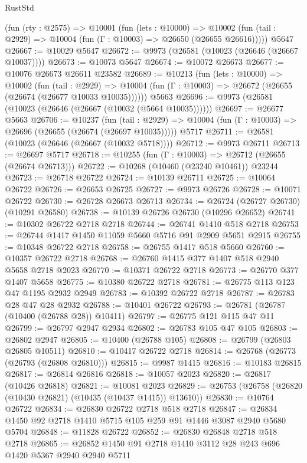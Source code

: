 \begin{lexlean}{RustStd}
\begin{coremodule}
    (fun (rty : @2575) =>
    @10001
      (fun (lets : @10000) =>
      @10002 (fun (tail : @2929) => @10004 (fun (Γ : @10003) => @26650 (@26655 @26616)))))
    @5647
@26667 := @10029 @5647
@26672 := @9973 (@26581 (@10023 (@26646 (@26667 @10037))))
@26673 := @10073 @5647
@26674 := @10072 @26673
@26677 := @10076 @26673 @26611 @23582
@26689 := @10213
    (fun (lets : @10000) =>
    @10002
      (fun (tail : @2929) =>
      @10004 (fun (Γ : @10003) => @26672 (@26655 (@26674 (@26677 @10033 @10035))))))
    @5663
@26696 := @9973 (@26581 (@10023 (@26646 (@26667 (@10032 (@5664 @10035))))))
@26697 := @26677 @5663
@26706 := @10237
    (fun (tail : @2929) => @10004 (fun (Γ : @10003) => @26696 (@26655 (@26674 (@26697 @10035)))))
    @5717
@26711 := @26581 (@10023 (@26646 (@26667 (@10032 @5718))))
@26712 := @9973 @26711
@26713 := @26697 @5717
@26718 := @10255 (fun (Γ : @10003) => @26712 (@26655 (@26674 @26713)))
@26722 := @10268 (@10460 (@23240 @10461)) @23244
@26723 := @26718 @26722
@26724 := @10139 @26711
@26725 := @10064 @26722
@26726 := @26653 @26725
@26727 := @9973 @26726
@26728 := @10071 @26722
@26730 := @26728 @26673 @26713
@26734 := @26724 (@26727 @26730) (@10291 @26580)
@26738 := @10139 @26726 @26730 (@10296 @26652)
@26741 := @10302 @26722 @2718 @2718
@26744 := @26741 @1410 @518 @2718
@26753 := @26744 @1417 @1450 @11059 @5660 @5716 @91 @2909 @5651 @2915
@26755 := @10348 @26722 @2718
@26758 := @26755 @1417 @518 @5660
@26760 := @10357 @26722 @2718
@26768 := @26760 @1415 @377 @1407 @518 @2940 @5658 @2718 @2023
@26770 := @10371 @26722 @2718
@26773 := @26770 @377 @1407 @5658
@26775 := @10380 @26722 @2718
@26781 := @26775 @113 @123 @47 @1195 @2932 @2949
@26783 := @10392 @26722 @2718
@26787 := @26783 @28 @47 @28 @2932
@26788 := @10401 @26722
@26793 := @26781 (@26787 (@10400 (@26788 @28)) @10411)
@26797 := @26775 @121 @115 @47 @11
@26799 := @26797 @2947 @2934
@26802 := @26783 @105 @47 @105
@26803 := @26802 @2947
@26805 := @10400 (@26788 @105)
@26808 := @26799 (@26803 @26805 @10511)
@26810 := @10417 @26722 @2718
@26814 := @26768 (@26773 (@26793 (@26808 @26810)))
@26815 := @9987 @1415
@26816 := @10183 @26815
@26817 := @26814 @26816
@26818 := @10057 @2023
@26820 := @26817 (@10426 @26818)
@26821 := @10081 @2023
@26829 := @26753 (@26758 (@26820 (@10430 @26821) (@10435 (@10437 @1415)) @13610))
@26830 := @10764 @26722
@26834 := @26830 @26722 @2718 @518 @2718
@26847 := @26834 @1450 @92 @2718 @1410 @5715 @105 @259 @91 @1446 @3087 @2940 @5680 @5704
@26848 := @11828 @26722
@26852 := @26830 @26848 @2718 @518 @2718
@26865 := @26852 @1450 @91 @2718 @1410 @3112 @28 @243 @696 @1420 @5367 @2940 @2940 @5711

\end{coremodule}
\end{lexlean}
